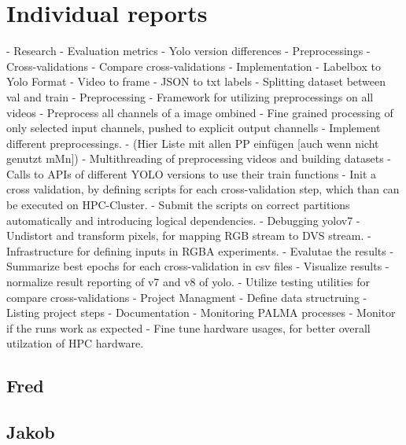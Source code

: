 \documentclass[sigchi,screen]{acmart}
\begin{document}
\section{Individual reports}
- Research
    - Evaluation metrics
    - Yolo version differences
    - Preprocessings
    - Cross-validations
    - Compare cross-validations
- Implementation
    - Labelbox to Yolo Format
        - Video to frame
        - JSON to txt labels
        - Splitting dataset between val and train
    - Preprocessing
        - Framework for utilizing preprocessings on all videos
            - Preprocess all channels of a image ombined
            - Fine grained processing of only selected input channels, pushed to explicit output channells
        - Implement different preprocessings.
            - (Hier Liste mit allen PP einfügen [auch wenn nicht genutzt mMn])
        - Multithreading of preprocessing videos and building datasets
        - Calls to APIs of different YOLO versions to use their train functions
        - Init a cross validation, by defining scripts for each cross-validation step, which than can be executed on HPC-Cluster.
        - Submit the scripts on correct partitions automatically and introducing logical dependencies.
        - Debugging yolov7
        - Undistort and transform pixels, for mapping RGB stream to DVS stream.
        - Infrastructure for defining inputs in RGBA experiments.
        - Evalutae the results
            - Summarize best epochs for each cross-validation in csv files
            - Visualize results
            - normalize result reporting of v7 and v8 of yolo.
            - Utilize testing utilities for compare cross-validations
- Project Managment
    - Define data structruing
    - Listing project steps
    - Documentation
- Monitoring PALMA processes
    - Monitor if the runs work as expected
    - Fine tune hardware usages, for better overall utilzation of HPC hardware.
\subsection{Fred}
\subsection{Jakob}

\newcommand{\escapeunderscore}[1]{%
    \StrSubstitute{#1}{_}{\string_}%
}
\newcommand{\substringtwenty}[1]{\StrMid{#1}{2}{11}}

\newcommand{\escapeunderscoreandsubstring}[1]{%
    \StrSubstitute{#1}{_}{\string_}[\temp]%
    \StrMid{\temp}{2}{20}%
}
\end{document}
